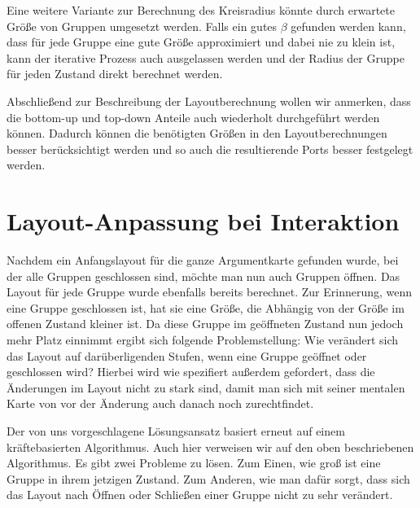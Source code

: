 Eine weitere Variante zur Berechnung des Kreisradius könnte durch erwartete Größe von Gruppen umgesetzt werden. 
Falls ein gutes $\beta$ gefunden werden kann, dass für jede Gruppe eine gute Größe approximiert und dabei nie zu klein ist, kann der iterative Prozess auch ausgelassen werden
und der Radius der Gruppe für jeden Zustand direkt berechnet werden.			


Abschließend zur Beschreibung der Layoutberechnung wollen wir anmerken, dass die bottom-up und top-down Anteile auch wiederholt durchgeführt werden können.
Dadurch können die benötigten Größen in den Layoutberechnungen besser berücksichtigt werden und so auch die resultierende Ports besser festgelegt werden.

\section{Layout-Anpassung bei Interaktion}%
\label{sec:Interaktion}
Nachdem ein Anfangslayout für die ganze Argumentkarte gefunden wurde, bei der alle Gruppen geschlossen sind, möchte man nun auch Gruppen öffnen. 
Das Layout für jede Gruppe wurde ebenfalls bereits berechnet. Zur Erinnerung, wenn eine Gruppe geschlossen ist, hat sie eine Größe, 
die Abhängig von der Größe im offenen Zustand kleiner ist. 
Da diese Gruppe im geöffneten Zustand nun jedoch mehr Platz einnimmt ergibt sich folgende Problemstellung:
Wie verändert sich das Layout auf darüberligenden Stufen, wenn eine Gruppe geöffnet oder geschlossen wird? 
Hierbei wird wie spezifiert außerdem gefordert, dass die Änderungen im Layout nicht zu stark sind, 
damit man sich mit seiner mentalen Karte von vor der Änderung auch danach noch zurechtfindet.

Der von uns vorgeschlagene Lösungsansatz basiert erneut auf einem kräftebasierten Algorithmus. 
Auch hier verweisen wir auf den oben beschriebenen Algorithmus. Es gibt zwei Probleme zu lösen. 
Zum Einen, wie groß ist eine Gruppe in ihrem jetzigen Zustand.  
Zum Anderen, wie man dafür sorgt, dass sich das Layout nach Öffnen oder Schließen einer Gruppe nicht zu sehr verändert.

